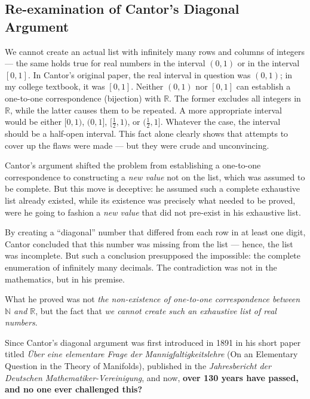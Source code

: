 \documentclass[12pt]{article}
\theoremstyle{definition} %
\numberwithin{equation}{section}
\begin{document}
\newpage
\subsection{Re-examination of Cantor's Diagonal Argument}

We cannot create an actual list with infinitely many rows and columns of integers — the same holds true for real numbers in the interval \( (0,1) \) or in the interval \( [0,1] \). In Cantor's original paper, the real interval in question was \( (0,1) \); in my college textbook, it was \( [0,1] \). Neither \( (0,1) \) nor \( [0,1] \) can establish a one-to-one correspondence (bijection) with \( \mathbb{R} \). The former excludes all integers in \( \mathbb{R} \), while the latter causes them to be repeated. A more appropriate interval would be either \( [0,1) \), \( (0,1] \), \( [\frac{1}{2},1) \), or \( (\frac{1}{2},1] \). Whatever the case, the interval should be a half-open interval. This fact alone clearly shows that attempts to cover up the flaws were made — but they were crude and unconvincing.



\vspace{1em}
Cantor’s argument shifted the problem from establishing a one-to-one correspondence to constructing a \emph{new value} not on the list, which was assumed to be complete. But this move is deceptive: he assumed such a complete exhaustive list already existed, while its existence was precisely what needed to be proved, were he going to fashion a \emph{new value} that did not pre-exist in his exhaustive list.

\vspace{1em}
By creating a “diagonal” number that differed from each row in at least one digit, Cantor concluded that this number was missing from the list — hence, the list was incomplete. But such a conclusion presupposed the impossible: the complete enumeration of infinitely many decimals. The contradiction was not in the mathematics, but in his premise.

\vspace{1em}
What he proved was not \emph{the non-existence of one-to-one correspondence between \(\mathbb{N}\) and \(\mathbb{R}\)}, but the fact that \emph{we cannot create such an exhaustive list of real numbers}.

\vspace{1em}

Since Cantor's diagonal argument was first introduced in 1891 in his short paper titled 
\textit{Über eine elementare Frage der Mannigfaltigkeitslehre} (On an Elementary Question in the Theory of Manifolds), 
published in the \textit{Jahresbericht der Deutschen Mathematiker-Vereinigung}, and now, \textbf{over 130 years have passed, and no one ever challenged this?}
\end{document}
